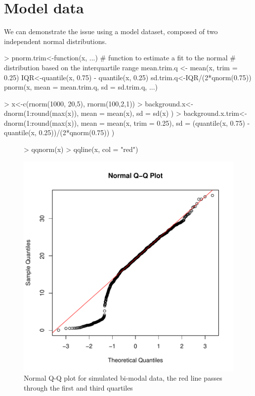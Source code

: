 \documentclass{article}
\renewenvironment{Schunk}{\vspace{\topsep}}{\vspace{\topsep}}
\begin{document}
\section{Model data}
We can demonstrate the issue using a model dataset, composed of two independent normal distributions.
\begin{Schunk}
\begin{Sinput}
> pnorm.trim<-function(x, ...){
 # function to estimate a fit to the normal
 # distribution based on the interquartile range
   mean.trim.q <- mean(x, trim = 0.25)
  	IQR<-quantile(x, 0.75) - quantile(x, 0.25)
  	sd.trim.q<-IQR/(2*qnorm(0.75))	
  	pnorm(x, mean = mean.trim.q, sd = sd.trim.q, ...)
  	}
\end{Sinput}
\end{Schunk}
\begin{Schunk}
\begin{Sinput}
> x<-c(rnorm(1000, 20,5), rnorm(100,2,1))
> background.x<-
   dnorm(1:round(max(x)),
             mean = mean(x),
             sd = sd(x)
       )
> background.x.trim<-
   dnorm(1:round(max(x)),
             mean = mean(x, trim = 0.25),
             sd = (quantile(x, 0.75) - quantile(x, 0.25))/(2*qnorm(0.75))
       )
\end{Sinput}
\end{Schunk}
\begin{figure}
\begin{center}
\begin{Schunk}
\begin{Sinput}
> qqnorm(x)
> qqline(x, col = "red")
\end{Sinput}
\end{Schunk}
\includegraphics{figs/-qqplot}
\end{center}
\caption{Normal Q-Q plot for simulated bi-modal data, the red line passes through the first and third quartiles}
\label{fig:qqplot}
\end{figure}
\end{document}
